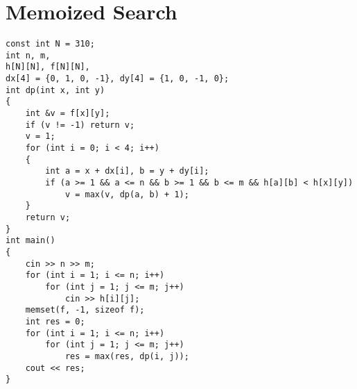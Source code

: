 \section{Memoized Search}
\begin{lstlisting}
const int N = 310;
int n, m, 
h[N][N], f[N][N], 
dx[4] = {0, 1, 0, -1}, dy[4] = {1, 0, -1, 0};
int dp(int x, int y)
{
    int &v = f[x][y];
    if (v != -1) return v;
    v = 1;
    for (int i = 0; i < 4; i++)
    {
        int a = x + dx[i], b = y + dy[i];
        if (a >= 1 && a <= n && b >= 1 && b <= m && h[a][b] < h[x][y])
            v = max(v, dp(a, b) + 1);
    }
    return v;
}
int main()
{
    cin >> n >> m;
    for (int i = 1; i <= n; i++)
        for (int j = 1; j <= m; j++)
            cin >> h[i][j];
    memset(f, -1, sizeof f);
    int res = 0;
    for (int i = 1; i <= n; i++)
        for (int j = 1; j <= m; j++)
            res = max(res, dp(i, j));
    cout << res;
}
\end{lstlisting}
